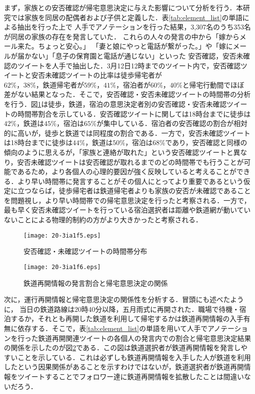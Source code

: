 \documentclass[japanese]{jnlp_1.4}
\begin{document}
まず，家族との安否確認が帰宅意思決定に与えた影響について分析を行う．本研究では家族を同居の配偶者および子供と定義した．表\ref{tab:element_list}の単語による抽出を行った上で
人手でアノテーションを行った結果，3,307名のうち353名が同居の家族の存在を発言していた．
これらの人々の発言の中から「嫁からメール来た。ちょっと安心。」
「妻と娘にやっと電話が繋がった。」や「嫁にメールが届かない」「息子の保育園と電話が通じない」といった
安否確認，安否未確認のツイートを人手で抽出した．3月12日12時までのツイート内で，安否確認ツイートと安否未確認ツイートの比率は徒歩帰宅者が$62\%，38\%，鉄道帰宅者が59\%，41\%，宿泊者が60\%，40\%$と帰宅行動間でほぼ差がない結果となった．そこで，安否確認・安否未確認ツイートの時間帯の分析を行う．図\ref{fig:FamilyTIme}は徒歩，鉄道，宿泊の意思決定者別の安否確認・安否未確認ツイートの時間帯割合を示している．安否確認ツイートに関しては18時台までに徒歩は$42\%$，鉄道は$45\%$，宿泊は$65\%$が集中している．宿泊者の安否確認の割合が相対的に高いが，徒歩と鉄道では同程度の割合である．一方で，安否未確認ツイートは18時台までに徒歩は$44\%$，鉄道は$50\%$，宿泊は$68\%$であり，安否確認と同様の傾向のように思えるが，「家族と連絡が取れた」という安否確認ツイートと異なり，安否未確認ツイートは安否確認が取れるまでのどの時間帯でも行うことが可能であるため，より各個人の心理的要因が強く反映していると考えることができる．より早い時間帯に発言することがその個人にとってより重要であるという仮定に立つならば，徒歩帰宅者は鉄道帰宅者よりも家族の安否が未確認であることを問題視し，より早い時間帯での帰宅意思決定を行ったと考察される．一方で，最も早く安否未確認ツイートを行っている宿泊選択者は距離や鉄道網が動いていないことによる物理的制約の方がより大きかったと考察される．

\begin{figure}[b]
\begin{center}
\texttt{[image: 20-3ia1f5.eps]}
\end{center}
\caption{安否確認・未確認ツイートの時間帯分布}
\label{fig:FamilyTIme}
\end{figure}
\begin{figure}[b]
\begin{center}
\texttt{[image: 20-3ia1f6.eps]}
\end{center}
\caption{鉄道再開情報の発言割合と帰宅意思決定の関係}
\label{fig:trainInformation}
\end{figure}


次に，運行再開情報と帰宅意思決定の関係性を分析する．冒頭にも述べたように，
当日の鉄道路線は20時40分以降，五月雨式に再開された．職場で待機・宿泊するか，それとも再開した鉄道を利用して帰宅するかは鉄道再開情報の入手有無に依存する．そこで，表\ref{tab:element_list}の単語を用いて人手でアノテーションを行った鉄道再開関連ツイートの各個人の発言内での割合と帰宅意思決定結果の関係を示したのが図\ref{fig:trainInformation}である．この図は鉄道選択者が鉄道再開情報を発言しやすいことを示している．これは必ずしも鉄道再開情報を入手した人が鉄道を利用したという因果関係があることを示すわけではないが，鉄道選択者が鉄道再開情報をツイートすることでフォロワー達に鉄道再開情報を拡散したことは間違いないだろう．
\end{document}
